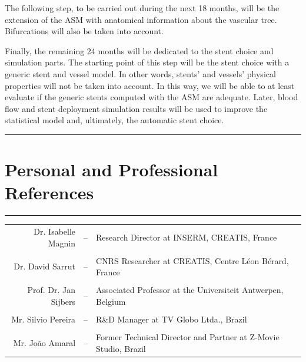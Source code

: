 \documentclass[a4paper]{article}
\begin{document}
The following step, to be carried out during the next 18 months, will be the extension of the ASM with anatomical information about the vascular tree. Bifurcations will also be taken into account. 

Finally, the remaining 24 months will be dedicated to the stent choice and simulation parts. The starting point of this step will be the stent choice with a generic stent and vessel model. In other words, stents' and vessels' physical properties will not be taken into account. In this way, we will be able to at least evaluate if the generic stents computed with the ASM are adequate. Later, blood flow and stent deployment simulation results will be used to improve the statistical model and, ultimately, the automatic stent choice.  




\pagebreak

\medskip
\medskip

\hrule
\section{Personal and Professional References}
\hrule

\medskip
\medskip

\medskip
\medskip

\begin{center}
\begin{tabular}{r c l}
Dr. Isabelle Magnin & -- & Research Director at INSERM, CREATIS, France\\
\\
Dr. David Sarrut & -- & CNRS Researcher at CREATIS, Centre L\'eon B\'erard, France\\
\\
Prof. Dr. Jan Sijbers & -- & Associated Professor at the Universiteit Antwerpen, Belgium \\
\\
Mr. Silvio Pereira & -- & R\&D Manager at TV Globo Ltda., Brazil \\
\\
Mr. Jo\~ao Amaral & -- & Former Technical Director and Partner at Z-Movie Studio, Brazil \\
\end{tabular}
\end{center}
\vfill

%
%
%
%
%

\end{document}

